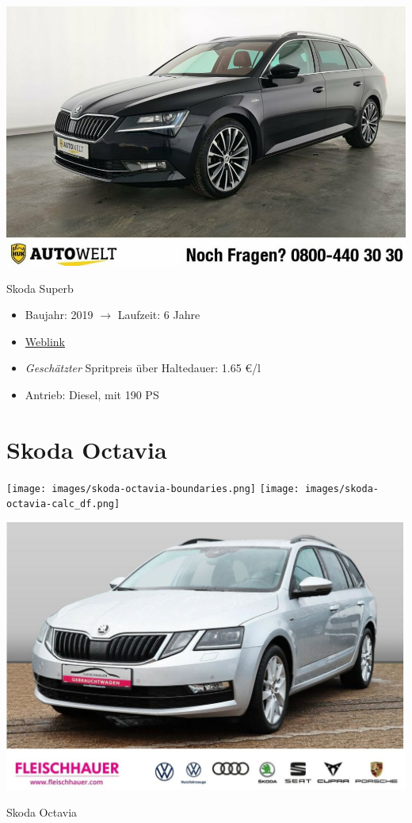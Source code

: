 \documentclass[landscape, DIV=99, 14pt]{scrartcl}
\begin{document}
\pagebreak
\null
\vspace{2cm}
\begin{center}
\includegraphics[width=0.9\columnwidth]{cars/skoda-superb.png}

Skoda Superb
\end{center}

\begin{itemize}
    \item Baujahr: 2019 $\rightarrow$ Laufzeit: 6 Jahre
    \item \href{https://suchen.mobile.de/fahrzeuge/details.html?id=336967099}{Weblink}
    \item \emph{Gesch\"atzter} Spritpreis \"uber Haltedauer: 1.65 \euro{}/l
    \item Antrieb: Diesel, mit 190 PS
\end{itemize}

\pagebreak


\twocolumn

\section*{Skoda Octavia}
\begin{center}
\texttt{[image: images/skoda-octavia-boundaries.png]}
\null
\vspace{0.5cm}
\texttt{[image: images/skoda-octavia-calc\_df.png]}
\end{center}

\pagebreak
\null
\vspace{2cm}
\begin{center}
\includegraphics[width=0.9\columnwidth]{cars/skoda-octavia.png}

Skoda Octavia
\end{center}
\end{document}
